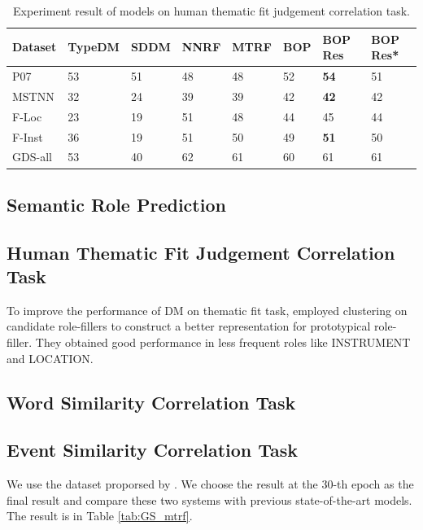 \documentclass[a4paper]{article}
\begin{document}
\begin{table}[t]
\centering
\begin{tabular}{l|l|l||l|l|l|l||l}
Dataset &   TypeDM  &   SDDM    &   NNRF    &   MTRF    &   BOP &   BOP Res     &   BOP Res*    \\ \hline
P07     &   53      &   51      &   48      &   48      &   52  &   \textbf{54} &   51          \\
MSTNN   &   32      &   24      &   39      &   39      &   42  &   \textbf{42} &   42          \\
F-Loc   &   23      &   19      &   51      &   48      &   44  &   45          &   44          \\
F-Inst  &   36      &   19      &   51      &   50      &   49  &   \textbf{51} &   50          \\
GDS-all &   53      &   40      &   62      &   61      &   60  &   61          &   61          \\
\end{tabular}
\caption{\label{tab:widgets} Experiment result of models on human thematic fit judgement correlation task.}
\end{table}


\subsection{Semantic Role Prediction}  \label{sec:roleprediction}

\subsection{Human Thematic Fit Judgement Correlation Task}  \label{sec:thematicfit}
To improve the performance of DM on thematic fit task, \citet{greenberg2015improving} employed clustering on candidate role-fillers to construct a better representation for prototypical role-filler. They obtained good performance in less frequent roles like INSTRUMENT and LOCATION. 

\subsection{Word Similarity Correlation Task}  \label{sec:wordsim}


\subsection{Event Similarity Correlation Task}  \label{sec:eventsim}
We use the dataset proporsed by \citet{grefenstette2015concrete}.
We choose the result at the $30$-th epoch as the final result and compare these two systems with previous state-of-the-art models. The result is in Table \ref{tab:GS_mtrf}. 
\end{document}
